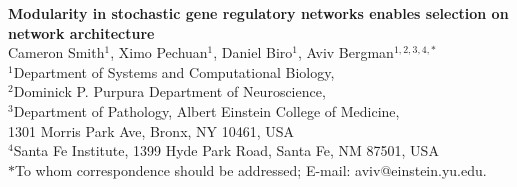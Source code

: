 



\let\ref\autoref


{}

\begin{center}
{\Large
\textbf{Modularity in stochastic gene regulatory networks enables selection on network architecture}
}
\\[.5cm]
Cameron Smith$^{1}$,
Ximo Pechuan$^{1}$,
Daniel Biro$^{1}$,
Aviv Bergman$^{1,2,3,4, \ast}$
\\[.5cm]
$^1$Department of Systems and Computational Biology,\\
$^2$Dominick P. Purpura Department of Neuroscience,\\
$^3$Department of Pathology, Albert Einstein College of Medicine,\\
1301 Morris Park Ave, Bronx, NY 10461, USA\\
$^4$Santa Fe Institute, 1399 Hyde Park Road, Santa Fe, NM 87501, USA
\\[.5cm]
$\ast$To whom correspondence should be addressed; E-mail: aviv@einstein.yu.edu.
\end{center}

% 

{ \bf

}
%



